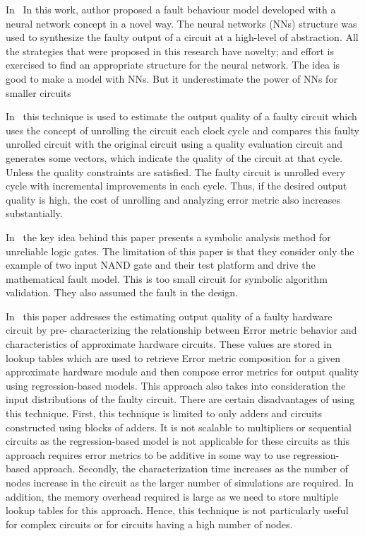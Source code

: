 In~\cite{mirzadeh2014modeling} In this work, author proposed a fault behaviour model developed with a neural network
concept in a novel way. The neural networks (NNs) structure was used to synthesize the faulty output of a
circuit at a high-level of abstraction. All the strategies that were proposed in this research have novelty;
and effort is exercised to find an appropriate structure for the neural network. The idea is good to make a model with NNs. But it underestimate the power of NNs for
smaller circuits



In~\cite{ranjan2014aslan} this technique is used to estimate the output quality of a faulty circuit which uses the concept
of unrolling the circuit each clock cycle and compares this faulty unrolled circuit with the original circuit
using a quality evaluation circuit and generates some vectors, which indicate the quality of the circuit
at that cycle. Unless the quality constraints are satisfied. The faulty circuit is unrolled every cycle with incremental improvements in each cycle. Thus,
if the desired output quality is high, the cost of unrolling and analyzing error metric also increases
substantially.

In~\cite{brkic2014symbolic} the key idea behind this paper presents a symbolic analysis method for unreliable logic
gates. The limitation of this paper is that they consider only the example of two input NAND gate
and their test platform and drive the mathematical fault model. This is too small circuit for symbolic
algorithm validation. They also assumed the fault in the design.

In~\cite{chan2013statistical} this paper addresses the estimating output quality of a faulty hardware circuit by pre-
characterizing the relationship between Error metric behavior and characteristics of approximate
hardware circuits. These values are stored in lookup tables which are used to retrieve Error metric
composition for a given approximate hardware module and then compose error metrics for output
quality using regression-based models. This approach also takes into consideration the input
distributions of the faulty circuit. There are certain disadvantages of using this technique. First, this technique is limited to
only adders and circuits constructed using blocks of adders. It is not scalable to multipliers or sequential
circuits as the regression-based model is not applicable for these circuits as this approach requires
error metrics to be additive in some way to use regression-based approach. Secondly, the
characterization time increases as the number of nodes increase in the circuit as the larger number of
simulations are required. In addition, the memory overhead required is large as we need to store
multiple lookup tables for this approach. Hence, this technique is not particularly useful for complex
circuits or for circuits having a high number of nodes.





